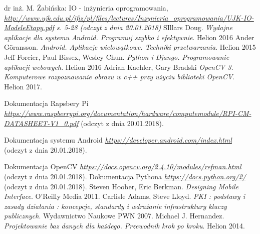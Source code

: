 \newpage
   \begin{thebibliography}{9}
    	dr inż. M. Żabińska: IO - inżynieria oprogramowania,
    	\textit{\href{http://www.ujk.edu.pl/ifiz/pl/files/lectures/Inzynieria\_oprogramowania/UJK-IO-ModeleEtapy.pdf}{http://www.ujk.edu.pl/ifiz/pl/files/lectures/Inzynieria\_oprogramowania/UJK-IO-ModeleEtapy.pdf} s. 5-28 (odczyt z dnia 20.01.2018)}
    	SIllars Doug.
    	\textit{Wydajne aplikacje dla systemu Android. Programuj szybko i efektywnie}. 
    	Helion 2016
    	Ander Göransson. 
    	\textit{Android. Aplikacje wielowątkowe. Techniki przetwarzania}. 
    	Helion 2015
    	Jeff Forcier, Paul Bissex, Wesley Chun.
    	\textit{Python i Django. Programowanie aplikacji webowych}. 
    	Helion 2016
    	Adrian Kaehler, Gary Bradski 
    	\textit{OpenCV 3. Komputerowe rozpoznawanie obrazu w c++ przy użyciu biblioteki OpenCV}. 
    	Helion 2017.
    
    		Dokumentacja Rapsbery Pi \\
    	\textit{ \href {https://www.raspberrypi.org/documentation/hardware/computemodule/RPI-CM-DATASHEET-V1_0.pdf} {https://www.raspberrypi.org/documentation/hardware/computemodule/RPI-CM-DATASHEET-V1\_0.pdf} }(odczyt z dnia 20.01.2018). 
    	
    	Dokumentacja systemu Android
    	\textit{ \href {https://developer.android.com/index.html} {https://developer.android.com/index.html} }(odczyt z dnia 20.01.2018). 
    	
    	Dokumentacja OpenCV
    	\textit{ \href {https://docs.opencv.org/2.4.10/modules/refman.html} {https://docs.opencv.org/2.4.10/modules/refman.html}} (odczyt z dnia 20.01.2018). 
    	Dokumentacja Pythona
    	\textit{ \href  {https://docs.python.org/2/}{https://docs.python.org/2/} }(odczyt z dnia 20.01.2018). 
    	Steven Hoober, Eric Berkman. 
    	\textit{Designing Mobile Interface}. 
    	 O'Reilly Media 2011.
    	 Carlisle Adams, Steve Lloyd. 
    	 \textit{PKI : podstawy i zasady działania : koncepcje, standardy i wdrażanie infrastruktury kluczy publicznych}. 
    	 Wydawnictwo Naukowe PWN 2007.
    	 Michael J. Hernandez. 
    	 \textit{Projektowanie baz danych dla każdego. Przewodnik krok po kroku}. 
    	 Helion 2014.
    	  
	 \end{thebibliography}
 
